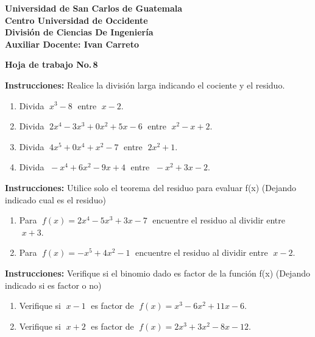 \documentclass[14pt]{extarticle}
\begin{document}
	
	\begin{flushleft}
		\textbf{Universidad de San Carlos de Guatemala\\
		Centro Universidad de Occidente\\
		División de Ciencias De Ingeniería\\
		Auxiliar Docente: Ivan Carreto\\[6pt]}
	\end{flushleft}
	
	\begin{center}
			\textbf{Hoja de trabajo No.\,8}
	\end{center}
	
	
	\bigskip
	
	\noindent\textbf{Instrucciones:} Realice la división larga indicando el cociente y el residuo.
	
	\begin{enumerate}[label=(\arabic*)]
		\item Divida $\;x^{3}-8\;$ entre $\;x-2.$
		\item Divida $\;2x^{4}-3x^{3}+0x^{2}+5x-6\;$ entre $\;x^{2}-x+2.$
		\item Divida $\;4x^{5}+0x^{4}+x^{2}-7\;$ entre $\;2x^{2}+1.$
		\item Divida $\;-x^{4}+6x^{2}-9x+4\;$ entre $\;-x^{2}+3x-2.$
	\end{enumerate}
	
	\bigskip
	

	\noindent\textbf{Instrucciones:} Utilice solo el teorema del residuo para evaluar f(x) (Dejando indicado cual es el residuo)
	
	\begin{enumerate}[label=(\arabic*), start=5]
		\item Para $\;f(x)=2x^{4}-5x^{3}+3x-7\;$ encuentre el residuo al dividir entre $\;x+3.$
		\item Para $\;f(x)=-x^{5}+4x^{2}-1\;$ encuentre el residuo al dividir entre $\;x-2.$
	\end{enumerate}
	
		\bigskip
	
	\noindent\textbf{Instrucciones:} Verifique si el binomio dado es factor de la función f(x) (Dejando indicado si es factor o no)
	
	\begin{enumerate}[label=(\arabic*), start=7]
		\item Verifique si $\;x-1\;$ es factor de $\;f(x)=x^{3}-6x^{2}+11x-6.$
		
		\item Verifique si $\;x+2\;$ es factor de $\;f(x)=2x^{3}+3x^{2}-8x-12.$ 
	\end{enumerate}
	
\end{document}
